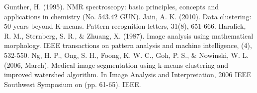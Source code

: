 \documentclass[conference]{IEEEtran}
\begin{document}
\begin{thebibliography}{1}
Gunther, H. (1995). NMR spectroscopy: basic principles, concepts and applications in chemistry (No. 543.42 GUN).
Jain, A. K. (2010). Data clustering: 50 years beyond K-means. Pattern recognition letters, 31(8), 651-666.
Haralick, R. M., Sternberg, S. R., \& Zhuang, X. (1987). Image analysis using mathematical morphology. IEEE transactions on pattern analysis and machine intelligence, (4), 532-550.
Ng, H. P., Ong, S. H., Foong, K. W. C., Goh, P. S., \& Nowinski, W. L. (2006, March). Medical image segmentation using k-means clustering and improved watershed algorithm. In Image Analysis and Interpretation, 2006 IEEE Southwest Symposium on (pp. 61-65). IEEE.

\end{thebibliography}




\end{document}
